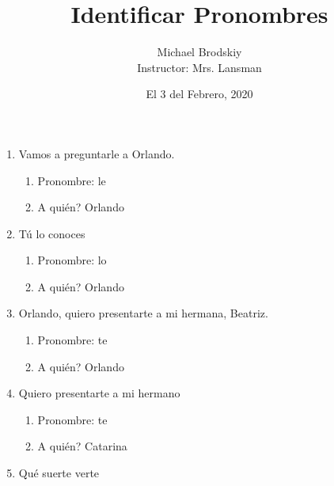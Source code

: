 \documentclass[12pt]{article}
\title{Identificar Pronombres}
\date{El 3 del Febrero, 2020}
\author{Michael Brodskiy\\ \small Instructor: Mrs. Lansman}
\begin{document}
\maketitle

\begin{enumerate}

  \item Vamos a preguntarle a Orlando.

    \begin{enumerate}

      \item Pronombre: le

      \item A qui\'en? Orlando

    \end{enumerate}

  \item T\'u lo conoces

    \begin{enumerate}

      \item Pronombre: lo

      \item A qui\'en? Orlando

    \end{enumerate}

  \item Orlando, quiero presentarte a mi hermana, Beatriz.

    \begin{enumerate}

      \item Pronombre: te

      \item A qui\'en? Orlando

    \end{enumerate}

  \item Quiero presentarte a mi hermano

    \begin{enumerate}

      \item Pronombre: te

      \item A qui\'en? Catarina

    \end{enumerate}

  \item Qu\'e suerte verte

    \begin{enumerate}


\end{enumerate}
\end{enumerate}
\end{document}
